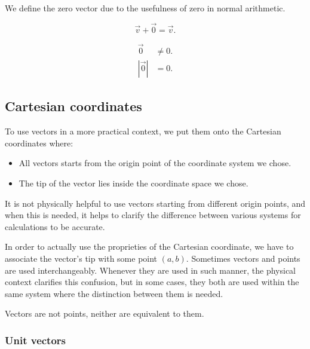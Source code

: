 We define the zero vector due to the usefulness of zero in normal arithmetic.

\begin{definition}
    \[
        \vec{v}+\vec{0}=\vec{v}
    .\] 
\end{definition}

\begin{note}
    \begin{align*}
        \vec{0} & \neq 0. \\
        |\vec{0}| & = 0.
    \end{align*}
\end{note}

\subsection{Cartesian coordinates}%
\label{sub:cartesian}


To use vectors in a more practical context, we put them onto the Cartesian coordinates where:
\begin{itemize}
    \item All vectors starts from the origin point of the coordinate system we chose.
    \item The tip of the vector lies inside the coordinate space we chose.
\end{itemize}

It is not physically helpful to use vectors starting from different origin points, and when this is needed, it helps to clarify the difference between various systems for calculations to be accurate.

In order to actually use the proprieties of the Cartesian coordinate, we have to associate the vector's tip with some point $(a,b)$. Sometimes vectors and points are used interchangeably. Whenever they are used in such manner, the physical context clarifies this confusion, but in some cases, they both are used within the same system where the distinction between them is needed.

\begin{note}
    Vectors are not points, neither are equivalent to them.
\end{note}

\subsubsection{Unit vectors}%
\label{ssub:unit-vectors}


